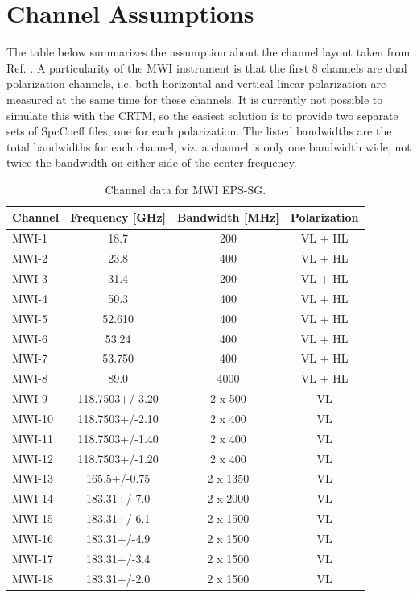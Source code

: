 \section{Channel Assumptions}
The table below summarizes the assumption about the channel layout taken from Ref. \cite{mwi}. A particularity of the MWI instrument is that the first 8 channels are dual polarization channels, i.e. both horizontal and vertical linear polarization are measured at the same time for these channels. It is currently not possible to simulate this with the CRTM, so the easiest solution is to provide two separate sets of SpcCoeff files, one for each polarization.
The listed bandwidths are the total bandwidths for each channel, viz. a channel is only one bandwidth wide, not twice the bandwidth on either side of the center frequency.
\begin{table}[h!]
\begin{center}
\begin{tabular}{ l | c | c | c }
 Channel & Frequency [GHz] & Bandwidth [MHz] & Polarization\\ 
 \hline \hline
 MWI-1 & 18.7 & 200 & VL + HL \\
 MWI-2 & 23.8 & 400 & VL + HL\\  
 MWI-3 & 31.4 & 200 & VL + HL\\  
 MWI-4 & 50.3 & 400 & VL + HL\\  
 MWI-5 & 52.610 & 400 & VL + HL\\  
 MWI-6 & 53.24 & 400 & VL + HL\\  
 MWI-7 & 53.750 & 400 & VL + HL\\  
 MWI-8 & 89.0 & 4000  & VL + HL\\  
 MWI-9 & 118.7503+/-3.20 & 2 x 500 & VL\\  
 MWI-10 & 118.7503+/-2.10 & 2 x 400 & VL\\  
 MWI-11 & 118.7503+/-1.40 & 2 x 400 & VL\\  
 MWI-12 & 118.7503+/-1.20 & 2 x 400 & VL\\  
 MWI-13 & 165.5+/-0.75 & 2 x 1350 & VL\\  
 MWI-14 & 183.31+/-7.0 & 2 x 2000 & VL\\  
 MWI-15 & 183.31+/-6.1 & 2 x 1500 & VL\\  
 MWI-16 & 183.31+/-4.9 & 2 x 1500 & VL\\  
 MWI-17 & 183.31+/-3.4 & 2 x 1500 & VL\\    
 MWI-18 & 183.31+/-2.0 & 2 x 1500 & VL 
\end{tabular}
 \caption{Channel data for MWI EPS-SG.}
 \label{tab:channels}
\end{center}
\end{table}

